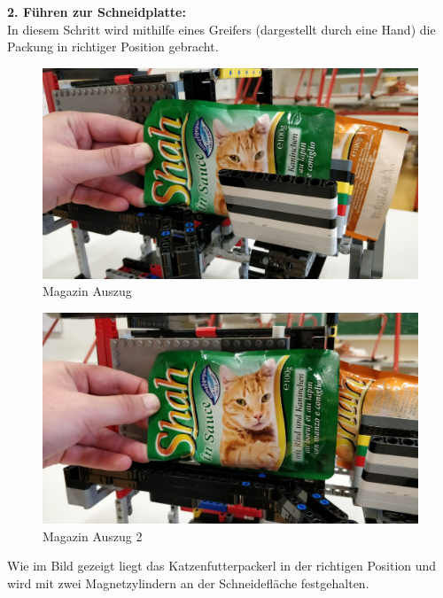 \documentclass[a4paper,12pt]{scrartcl}
\begin{document}
\newpage 

\textbf{2. Führen zur Schneidplatte:} \\ 

In diesem Schritt wird mithilfe eines Greifers (dargestellt durch eine Hand) die Packung in richtiger Position gebracht.

\begin{figure}[H]
\begin{center}
\includegraphics[width=13cm]{Bilder/Ablauf_1_png/Magazin_Auszug.jpeg}
\caption{Magazin Auszug}
\end{center}
\end{figure}

\begin{figure}[H]
\begin{center}
\includegraphics[width=13cm]{Bilder/Ablauf_1_png/Magazin_Auszug_2.jpeg}
\caption{Magazin Auszug 2}
\end{center}
\end{figure}

Wie im Bild gezeigt liegt das Katzenfutterpackerl in der richtigen Position und wird mit zwei Magnetzylindern an der Schneidefläche festgehalten.
\end{document}
